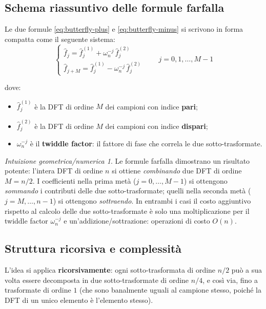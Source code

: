 \documentclass[a4paper,12pt]{article}
\theoremstyle{definition}
\theoremstyle{remark}
\newtheorem*{intuizione}{Intuizione geometrica/numerica}
\begin{document}
\subsection{Schema riassuntivo delle formule farfalla}

Le due formule \eqref{eq:butterfly-plus} e \eqref{eq:butterfly-minus}
si scrivono in forma compatta come il seguente sistema:
\begin{equation}
  \begin{cases}
    \hat{f}_j     = \hat{f}_j^{(1)} + \omega_n^{-j}\,\hat{f}_j^{(2)} \\[4pt]
    \hat{f}_{j+M} = \hat{f}_j^{(1)} - \omega_n^{-j}\,\hat{f}_j^{(2)}
  \end{cases}
  \qquad j = 0, 1, \ldots, M-1
  \label{eq:butterfly-system}
\end{equation}

\noindent dove:
\begin{itemize}
  \item $\hat{f}_j^{(1)}$ è la DFT di ordine $M$ dei campioni con
        indice \textbf{pari};
  \item $\hat{f}_j^{(2)}$ è la DFT di ordine $M$ dei campioni con
        indice \textbf{dispari};
  \item $\omega_n^{-j}$ è il \textbf{twiddle factor}: il fattore di fase
        che correla le due sotto-trasformate.
\end{itemize}

\begin{intuizione}
Le formule farfalla dimostrano un risultato potente: l'intera DFT di
ordine $n$ si ottiene \emph{combinando} due DFT di ordine $M = n/2$.
I coefficienti nella prima metà ($j = 0, \ldots, M-1$) si ottengono
\emph{sommando} i contributi delle due sotto-trasformate; quelli nella
seconda metà ($j = M, \ldots, n-1$) si ottengono \emph{sottraendo}.
In entrambi i casi il costo aggiuntivo rispetto al calcolo delle due
sotto-trasformate è solo una moltiplicazione per il twiddle factor
$\omega_n^{-j}$ e un'addizione/sottrazione: operazioni di costo $O(n)$.
\end{intuizione}

\subsection{Struttura ricorsiva e complessità}

L'idea si applica \textbf{ricorsivamente}: ogni sotto-trasformata di
ordine $n/2$ può a sua volta essere decomposta in due sotto-trasformate
di ordine $n/4$, e così via, fino a trasformate di ordine $1$ (che sono
banalmente uguali al campione stesso, poiché la DFT di un unico elemento
è l'elemento stesso).
\end{document}
